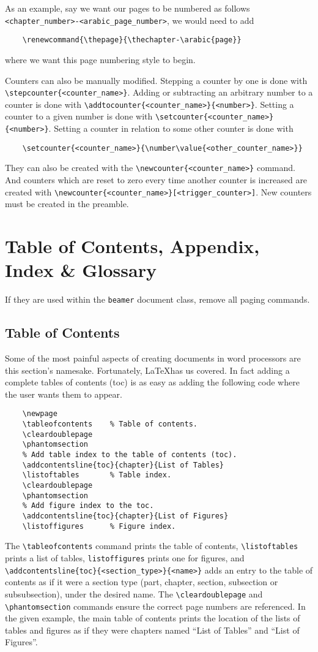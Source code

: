 As an example, say we want our pages to be numbered as follows
\verb|<chapter_number>-<arabic_page_number>|, we would need to add
\begin{verbatim}
	\renewcommand{\thepage}{\thechapter-\arabic{page}}
\end{verbatim}
where we want this page numbering style to begin.

Counters can also be manually modified.  Stepping a counter by one is
done with \verb|\stepcounter{<counter_name>}|.  Adding or subtracting
an arbitrary number to a counter is done with
\verb|\addtocounter{<counter_name>}{<number>}|.  Setting a counter to
a given number is done with
\verb|\setcounter{<counter_name>}{<number>}|.  Setting a counter in
relation to some other counter is done with
\begin{verbatim}
	\setcounter{<counter_name>}{\number\value{<other_counter_name>}}
\end{verbatim}
They can also be created with the \verb|\newcounter{<counter_name>}|
command.  And counters which are reset to zero every time another
counter is increased are created with
\verb|\newcounter{<counter_name>}[<trigger_counter>]|.  New counters
must be created in the preamble.
%
\section{Table of Contents, Appendix, Index \& Glossary}\label{s:contents}
%
If they are used within the \verb|beamer| document class, remove all
paging commands.
\subsection{Table of Contents}
%
Some of the most painful aspects of creating documents in word
processors are this section's namesake.  Fortunately, \LaTeX has us
covered.  In fact adding a complete tables of contents (toc) is as
easy as adding the following code where the user wants them to appear.
\begin{verbatim}
	\newpage
	\tableofcontents    % Table of contents.
	\cleardoublepage
	\phantomsection
	% Add table index to the table of contents (toc).
	\addcontentsline{toc}{chapter}{List of Tables}
	\listoftables       % Table index.
	\cleardoublepage
	\phantomsection
	% Add figure index to the toc.
	\addcontentsline{toc}{chapter}{List of Figures}
	\listoffigures      % Figure index.
\end{verbatim}
The \verb|\tableofcontents| command prints the table of contents,
\verb|\listoftables| prints a list of tables, \verb|listoffigures|
prints one for figures, and
\verb|\addcontentsline{toc}{<section_type>}{<name>}| adds an entry to
the table of contents as if it were a section type (part, chapter,
section, subsection or subsubsection), under the desired name.  The
\verb|\cleardoublepage| and \verb|\phantomsection| commands ensure the
correct page numbers are referenced.  In the given example, the main
table of contents prints the location of the lists of tables and
figures as if they were chapters named ``List of Tables'' and ``List
of Figures''.

